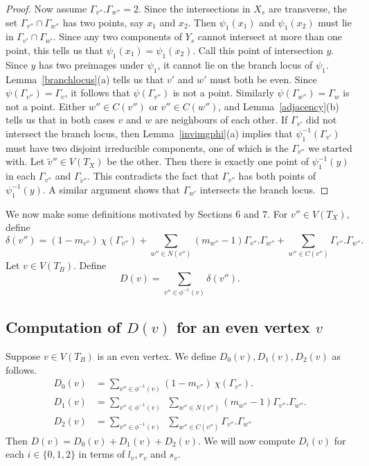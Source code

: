 \begin{proof}
Now assume $\Gamma_{v''}.\Gamma_{w''} = 2$. Since the intersections in $X_s$ are transverse, the set $\Gamma_{v''} \cap \Gamma_{w''}$ has two points, say $x_1$ and $x_2$. Then $\psi_1(x_1)$ and $\psi_1(x_2)$ must lie in $\Gamma_{v'} \cap \Gamma_{w'}$. Since any two components of $Y_s$ cannot intersect at more than one point, this tells us that $\psi_1(x_1) = \psi_1(x_2)$. Call this point of intersection $y$. Since $y$ has two preimages under $\psi_1$, it cannot lie on the branch locus of $\psi_1$. Lemma~\ref{branchlocus}(a) tells us that $v'$ and $w'$ must both be even. Since $\psi(\Gamma_{v''}) = \Gamma_v$, it follows that $\psi(\Gamma_{v''})$ is not a point. Similarly $\psi(\Gamma_{w''}) = \Gamma_w$ is not a point. Either $w'' \in C(v'')$ or $v'' \in C(w'')$, and Lemma~\ref{adjacency}(b) tells us that in both cases $v$ and $w$ are neighbours of each other. If $\Gamma_{v'}$ did not intersect the branch locus, then Lemma~\ref{invimgphi}(a) implies that $\psi_1^{-1}(\Gamma_{v'})$ must have two disjoint irreducible components, one of which is the $\Gamma_{v''}$ we started with. Let $\tilde{v}'' \in V(T_X)$ be the other. Then there is exactly one point of $\psi_1^{-1}(y)$ in each $\Gamma_{v''}$ and $\Gamma_{\tilde{v}''}$. This contradicts the fact that $\Gamma_{v''}$ has both points of $\psi_1^{-1}(y)$. A similar argument shows that $\Gamma_{w'}$ intersects the branch locus.
\end{proof}

We now make some definitions motivated by Sections $6$ and $7$. For $v'' \in V(T_X)$, define
\[ \delta(v'') =  (1-m_{v''})\ \chi(\Gamma_{v''}) + \sum_{w'' \in N({v''})} (m_{w''} - 1) \Gamma_{v''}.\Gamma_{w''} +  \sum_{w'' \in C({v''})} \Gamma_{v''}.\Gamma_{w''}   .\]
Let $v \in V(T_B)$. Define 
\[ D(v) = \sum_{v'' \in \phi^{-1}(v)} \delta(v''). \]

\subsection{Computation of $D(v)$ for an even vertex $v$}
Suppose $v \in V(T_B)$ is an even vertex. We define $D_0(v), D_1(v), D_2(v)$ as follows.
\begin{align*}
D_0(v) &= \sum_{v'' \in \phi^{-1}(v)} (1-m_{v''})\ \chi(\Gamma_{v''}) .\\
D_1(v) &= \sum_{v'' \in \phi^{-1}(v)} \ \ \sum_{w'' \in N({v''})} (m_{w''} - 1) \Gamma_{v''}.\Gamma_{w''} .\\
D_2(v) &= \sum_{v'' \in \phi^{-1}(v)} \ \ \sum_{w'' \in C({v''})} \Gamma_{v''}.\Gamma_{w''} 
\end{align*}
Then $D(v) = D_0(v)+D_1(v)+D_2(v)$. We will now compute $D_i(v)$ for each $i \in \{0,1,2\}$ in terms of $l_v,r_v$ and $s_v$.

